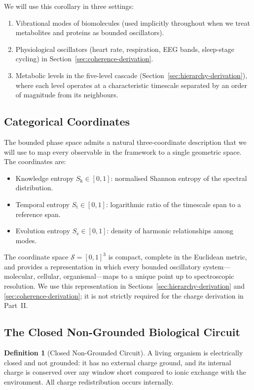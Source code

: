 \documentclass[11pt,twocolumn,a4paper]{article}
\theoremstyle{definition}
\newtheorem{definition}[theorem]{Definition}
\theoremstyle{remark}
\newcommand{\Sk}{S_{\mathrm{k}}}
\newcommand{\St}{S_{\mathrm{t}}}
\newcommand{\Se}{S_{\mathrm{e}}}
\newcommand{\Sspace}{\mathcal{S}}
\begin{document}
We will use this corollary in three settings:
\begin{enumerate}
\item Vibrational modes of biomolecules (used implicitly throughout
when we treat metabolites and proteins as bounded oscillators).
\item Physiological oscillators (heart rate, respiration, EEG
bands, sleep-stage cycling) in Section~\ref{sec:coherence-derivation}.
\item Metabolic levels in the five-level cascade
(Section~\ref{sec:hierarchy-derivation}), where each level operates
at a characteristic timescale separated by an order of magnitude
from its neighbours.
\end{enumerate}

\subsection{Categorical Coordinates}

The bounded phase space admits a natural three-coordinate
description that we will use to map every observable in the framework
to a single geometric space. The coordinates are:
\begin{itemize}[leftmargin=*]
\item Knowledge entropy $\Sk \in [0,1]$: normalised Shannon entropy
of the spectral distribution.
\item Temporal entropy $\St \in [0,1]$: logarithmic ratio of the
timescale span to a reference span.
\item Evolution entropy $\Se \in [0,1]$: density of harmonic
relationships among modes.
\end{itemize}

The coordinate space $\Sspace = [0,1]^3$ is compact, complete in the
Euclidean metric, and provides a representation in which every
bounded oscillatory system---molecular, cellular, organismal---maps
to a unique point up to spectroscopic resolution. We use this
representation in Sections~\ref{sec:hierarchy-derivation} and
\ref{sec:coherence-derivation}; it is not strictly required for the
charge derivation in Part~II.

\subsection{The Closed Non-Grounded Biological Circuit}

\begin{definition}[Closed Non-Grounded Circuit]
\label{def:closed-circuit}
A living organism is electrically closed and not grounded: it has no
external charge ground, and its internal charge is conserved over any
window short compared to ionic exchange with the environment. All
charge redistribution occurs internally.
\end{definition}
\end{document}
